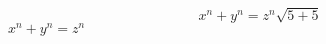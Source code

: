 \documentclass{article}
\begin{document}
\begin{displaymath}
x^n + y^n = z^n\sqrt{5 + 5} 
\end{displaymath}
\begin{math}
x^n + y^n = z^n
\end{math}
\end{document}
